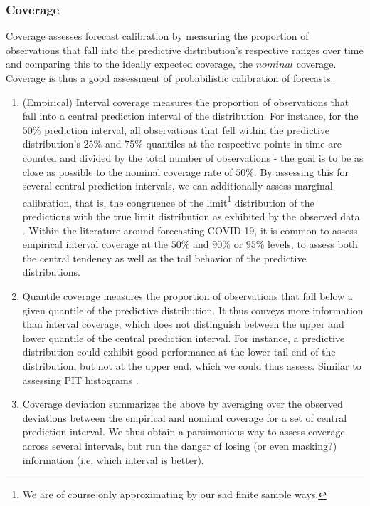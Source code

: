 \subsubsection{Coverage}
Coverage assesses forecast calibration by measuring the proportion of observations that fall into the predictive distribution's respective ranges over time and comparing this to the ideally expected coverage, the $nominal$ coverage. Coverage is thus a good assessment of probabilistic calibration of forecasts.
\begin{enumerate}
\item (Empirical) Interval coverage measures the proportion of observations that fall into a central prediction interval of the distribution. For instance, for the $50\%$ prediction interval, all observations that fell within the predictive distribution's $25\%$ and $75\%$ quantiles at the respective points in time are counted and divided by the total number of observations - the goal is to be as close as possible to the nominal coverage rate of $50\%$. By assessing this for several central prediction intervals, we can additionally assess marginal calibration, that is, the congruence of the limit\footnote{We are of course only approximating by our sad finite sample ways.} distribution of the predictions with the true limit distribution as exhibited by the observed data \cite{gneiting_probabilistic_2007}. Within the literature around forecasting COVID-19, it is common to assess empirical interval coverage at the $50\%$ and $90\%$ or $95\%$ levels, to assess both the central tendency as well as the tail behavior of the predictive distributions.
\item Quantile coverage measures the proportion of observations that fall below a given quantile of the predictive distribution. It thus conveys more information than interval coverage, which does not distinguish between the upper and lower quantile of the central prediction interval. For instance, a predictive distribution could exhibit good performance at the lower tail end of the distribution, but not at the upper end, which we could thus assess. Similar to assessing PIT histograms \cite{bosse_evaluating_2022}.
\item Coverage deviation summarizes the above by averaging over the observed deviations between the empirical and nominal coverage for a set of central prediction interval. We thus obtain a parsimonious way to assess coverage across several intervals, but run the danger of losing (or even masking?) information (i.e. which interval is better).
\end{enumerate}
